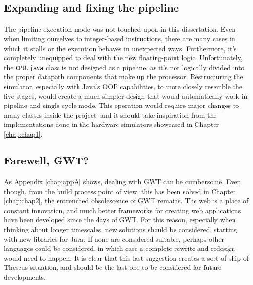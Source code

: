 \subsection{Expanding and fixing the pipeline}
\paragraph{}
The pipeline execution mode was not touched upon in this dissertation. Even when limiting ourselves to integer-based instructions, there are many cases in which it stalls or the execution behaves in unexpected ways. Furthermore, it's completely unequipped to deal with the new floating-point logic. Unfortunately, the \verb|CPU.java| class is not designed as a pipeline, as it's not logically divided into the proper datapath components that make up the processor. Restructuring the simulator, especially with Java's OOP capabilities, to more closely resemble the five stages, would create a much simpler design that would automatically work in pipeline and single cycle mode. This operation would require major changes to many classes inside the project, and it should take inspiration from the implementations done in the hardware simulators showcased in Chapter \ref{chap:chap1}.
\subsection{Farewell, GWT?}
\paragraph{}
As Appendix \ref{chap:appA} shows, dealing with GWT can be cumbersome. Even though, from the build process point of view, this has been solved in Chapter \ref{chap:chap2}, the entrenched obsolescence of GWT remains. The web is a place of constant innovation, and much better frameworks for creating web applications have been developed since the days of GWT. For this reason, especially when thinking about longer timescales, new solutions should be considered, starting with new libraries for Java. If none are considered suitable, perhaps other languages could be considered, in which case a complete rewrite and redesign would need to happen. It is clear that this last suggestion creates a sort of ship of Theseus situation, and should be the last one to be considered for future developments.


